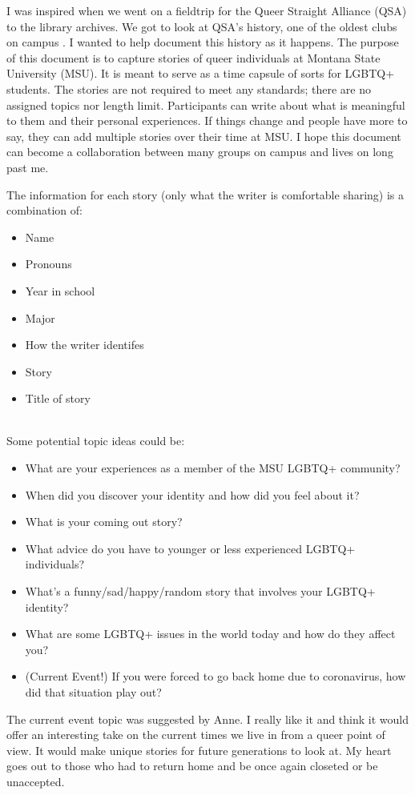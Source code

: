 I was inspired when we went on a fieldtrip for the Queer Straight Alliance 
(QSA) to the library archives. We got to look at QSA’s history, one of the 
oldest clubs on campus . I wanted to help document this history as it happens. The purpose of 
this document is to capture stories of queer individuals at Montana State 
University (MSU). It is meant to serve as a time capsule of sorts for LGBTQ+ 
students. The stories are not required to meet any standards; there are no 
assigned topics nor length limit. Participants can write about what is 
meaningful to them and their personal experiences. If things change and people
have more to say, they can add multiple stories over their time at MSU. I hope 
this document can become a collaboration between many groups on campus and 
lives on long past me.


The information for each story (only what the writer is comfortable sharing) is 
a combination of:
\begin{itemize}
    \item Name
    \item Pronouns
    \item Year in school
    \item Major
    \item How the writer identifes
    \item Story
    \item Title of story
\end{itemize}
\\
Some potential topic ideas could be:
\begin{itemize}
    \item What are your experiences as a member of the MSU LGBTQ+ community?
    \item When did you discover your identity and how did you feel about it?
    \item What is your coming out story?
    \item What advice do you have to younger or less experienced LGBTQ+ 
        individuals?
    \item What’s a funny/sad/happy/random story that involves your LGBTQ+ 
        identity?
    \item What are some LGBTQ+ issues in the world today and how do they affect
        you?
    \item (Current Event!) If you were forced to go back home due to 
        coronavirus, how did that situation play out?
\end{itemize}

The current event topic was suggested by Anne. I really like it and think it 
would offer an interesting take on the current times we live in from a queer 
point of view. It would make unique stories for future generations to look at. 
My heart goes out to those who had to return home and be once again closeted or 
be unaccepted. 
